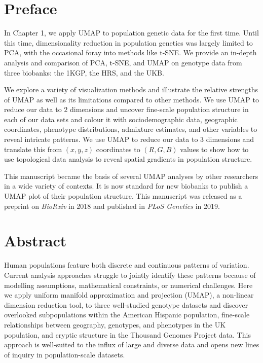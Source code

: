 \setcounter{section}{-1}

\section{Preface}

In Chapter 1, we apply UMAP to population genetic data for the first time. Until this time, dimensionality reduction in population genetics was largely limited to PCA, with the occasional foray into methods like t-SNE. We provide an in-depth analysis and comparison of PCA, t-SNE, and UMAP on genotype data from three biobanks: the 1KGP, the HRS, and the UKB.

We explore a variety of visualization methods and illustrate the relative strengths of UMAP as well as its limitations compared to other methods. We use UMAP to reduce our data to $2$ dimensions and uncover fine-scale population structure in each of our data sets and colour it with sociodemographic data, geographic coordinates, phenotype distributions, admixture estimates, and other variables to reveal intricate patterns. We use UMAP to reduce our data to $3$ dimensions and translate this from $(x,y,z)$ coordinates to $(R,G,B)$ values to show how to use topological data analysis to reveal spatial gradients in population structure.

This manuscript became the basis of several UMAP analyses by other researchers in a wide variety of contexts. It is now standard for new biobanks to publish a UMAP plot of their population structure. This manuscript was released as a preprint on \textit{BioRxiv} in 2018 and published in \textit{PLoS Genetics} in 2019.

\section{Abstract}

Human populations feature both discrete and continuous patterns of variation. Current analysis approaches struggle to jointly identify these patterns because of modelling assumptions, mathematical constraints, or numerical challenges. Here we apply uniform manifold approximation and projection (UMAP), a non-linear dimension reduction tool, to three well-studied genotype datasets and discover overlooked subpopulations within the American Hispanic population, fine-scale relationships between geography, genotypes, and phenotypes in the UK population, and cryptic structure in the Thousand Genomes Project data. This approach is well-suited to the influx of large and diverse data and opens new lines of inquiry in population-scale datasets.

